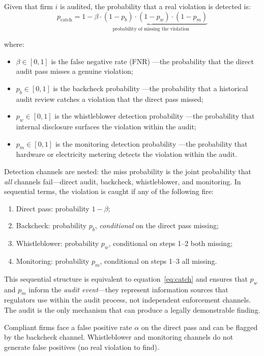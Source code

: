 Given that firm $i$ is audited, the probability that a real violation is detected is:
\begin{equation}
    p_{\text{catch}} = 1 - \underbrace{\beta \cdot (1 - p_b) \cdot (1 - p_w) \cdot (1 - p_m)}_{\text{probability of missing the violation}}
    \label{eq:catch}
\end{equation}

where:
\begin{itemize}
    \item $\beta \in [0,1]$ is the false negative rate (FNR) ---the probability that the direct audit pass misses a genuine violation;
    \item $p_b \in [0,1]$ is the backcheck probability ---the probability that a historical audit review catches a violation that the direct pass missed;
    \item $p_w \in [0,1]$ is the whistleblower detection probability ---the probability that internal disclosure surfaces the violation within the audit;
    \item $p_m \in [0,1]$ is the monitoring detection probability ---the probability that hardware or electricity metering detects the violation within the audit.
\end{itemize}

Detection channels are nested: the miss probability is the joint probability that \emph{all} channels fail---direct audit, backcheck, whistleblower, and monitoring. In sequential terms, the violation is caught if any of the following fire:
\begin{enumerate}
    \item Direct pass: probability $1 - \beta$;
    \item Backcheck: probability $p_b$, \emph{conditional} on the direct pass missing;
    \item Whistleblower: probability $p_w$, conditional on steps 1--2 both missing;
    \item Monitoring: probability $p_m$, conditional on steps 1--3 all missing.
\end{enumerate}
This sequential structure is equivalent to equation~\eqref{eq:catch} and ensures that $p_w$ and $p_m$ inform the \emph{audit event}---they represent information sources that regulators use within the audit process, not independent enforcement channels. The audit is the only mechanism that can produce a legally demonstrable finding.


Compliant firms face a false positive rate $\alpha$ on the direct pass and can be flagged by the backcheck channel. Whistleblower and monitoring channels do not generate false positives (no real violation to find).


